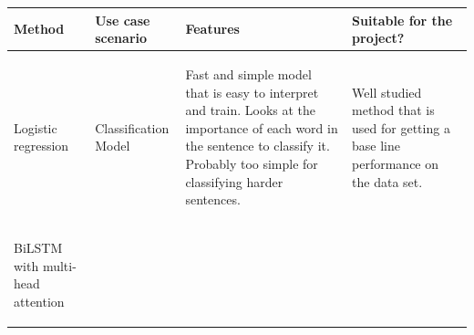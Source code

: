 \documentclass[
 reprint,
 amsmath,amssymb,
 aps,
]{revtex4-2}
\begin{document}
\onecolumngrid
\begin{center}
	\label{tab:methodsoverview}
	\begin{tabular}{| l | l | l | l |}
		\hline
		\parbox[t]{1.8cm}{
			{\bf Method }
		}              &
		\parbox[t]{4cm}{
			{\bf Use case scenario }
		}              &
		\parbox[t]{5.5cm}{
			{\bf Features }
		}              &
		\parbox[t]{5.5cm}{
			{\bf Suitable for the project? }
		}                \\
		\hline
		\hspace{0.1cm}
		\parbox{1.8cm}{\begin{flushleft}
				               Logistic regression
			               \end{flushleft}}
		\hspace{0.1cm}
		               &
		\hspace{0.1cm}
		\parbox{2.8cm}{\begin{flushleft}
				               Classification Model
			               \end{flushleft}}
		\hspace{0.1cm}
		               &
		\hspace{0.1cm}
		\parbox{5.5cm}{\begin{flushleft}
				               Fast and simple model that is easy to interpret and train. Looks at the importance of each word in the sentence to classify it. Probably too simple for classifying harder sentences.
			               \end{flushleft}}
		\hspace{0.1cm}
		               &
		\hspace{0.1cm}
		\parbox{5.5cm}{\begin{flushleft}
				               Well studied method that is used for getting a base line performance on the data set.
			               \end{flushleft}}
		\hspace{0.1cm}
		\\
		\hline
		\hspace{0.1cm}
		\parbox{1.8cm}{\begin{flushleft}
				               BiLSTM with multi-head attention
			               \end{flushleft}}
		\hspace{0.1cm}
		               &
		\hspace{0.1cm}

\end{tabular}
\end{center}
\end{document}

